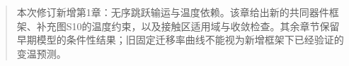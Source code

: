 \documentclass[11pt,a4paper]{article}
\begin{document}
\begin{titlepage}
\begin{abstract}
\par
{}
\medskip
\par\medskip
{\cjkfont 本次修订新增第1章：无序跳跃输运与温度依赖。该章给出新的共同器件框架、补充图S10的温度约束，以及接触区适用域与收敛检查。其余章节保留早期模型的条件性结果；旧固定迁移率曲线不能视为新增框架下已经验证的变温预测。}\par
\end{abstract}
\end{titlepage}
\setcounter{page}{1}
\end{document}
